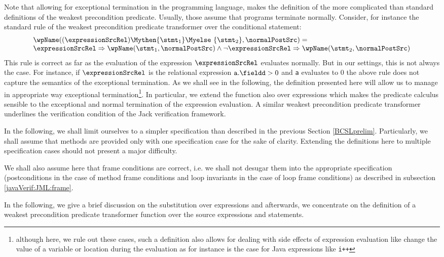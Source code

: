 Note that allowing for exceptional termination in the programming language,
 makes the definition of the \wpName{} more complicated  than standard definitions of the weakest precondition predicate. 
Usually, those assume that programs  terminate normally. 
Consider, for instance the standard rule of the weakest precondition predicate transformer over the conditional statement:
$$  \begin{array}{l}
\wpName((  \expressionSrcRel  )  \Mythen  \{ \stmt_1 \}   \Myelse \ \{ \stmt_2 \}, \normalPostSrc) = \\
  \expressionSrcRel \Rightarrow \wpName( \stmt_1, \normalPostSrc) \wedge
  \neg \expressionSrcRel \Rightarrow \wpName( \stmt_2, \normalPostSrc) \end{array}
$$
This rule is correct as far as the evaluation of the expression $\expressionSrcRel$ evaluates normally. But in our settings, this is not always the case.
For instance, if $ \expressionSrcRel$ is the relational expression $\mbox{\rm\texttt{a}}.\fieldd > 0$ and    \mbox{\rm\texttt{a}} evaluates to 0
the above rule does not capture the semantics of the exceptional termination. As we shall see in the following, the definition presented here  will allow us to manage in  appropriate way
 exceptional termination\footnote{although here, we rule out these cases, such a definition also allows for dealing with side effects of expression evaluation like change
 the value of a variable or location during the evaluation as for instance is the case for Java expressions like \lstinline!i++!}.
 In particular, we extend the \wpName{} function also over expressions which makes the predicate calculus sensible to the exceptional and normal termination of the 
expression evaluation. A similar  weakest precondition predicate transformer underlines the verification condition of
 the Jack verification framework.


In the following, we shall limit ourselves to a simpler specification than described in the previous Section \ref{BCSLprelim}.
Particularly, we shall assume that  methods are provided only with one specification case for the sake of clarity.
 Extending the definitions here to multiple specification  cases should not present a major difficulty.

We shall also assume here that frame conditions are correct, i.e. we shall not desugar them  into the appropriate specification 
(postconditions in the  case of method frame conditions and loop invariants in the case of  loop frame conditions) as described in
subsection \ref{javaVerif:JML:frame}. 

In the following, we give a brief discussion on the substitution over expressions and afterwards, we concentrate
 on the definition of a weakest precondition predicate transformer function over the source expressions and statements.
